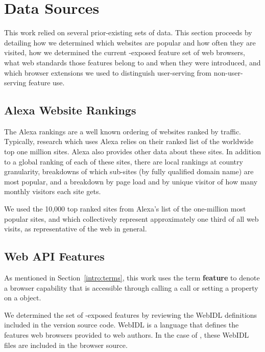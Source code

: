\section{Data Sources}
\label{measurement:data-sources}

This work relied on several prior-existing sets of data.  This section proceeds by
detailing how we determined which websites are popular and how often
they are visited, how we determined the current \JS-exposed feature set
of web browsers, what web standards those features belong to and when
they were introduced, and which browser extensions we used to distinguish
user-serving from non-user-serving feature use.


\subsection{Alexa Website Rankings}
\label{measurement:data-sources:website-popularity-rankings}
The Alexa rankings are a well known ordering of websites ranked by traffic.
Typically, research which uses Alexa relies on their ranked list of the
worldwide top one million sites. Alexa also provides other data about these sites.
In addition to a global ranking of each of these sites,
there are local rankings at country granularity, breakdowns of which
sub-sites (by fully qualified domain name) are most popular, and a breakdown by
page load and by unique visitor of how many monthly visitors each site gets.

We used the 10,000 top ranked sites from Alexa's list of the one-million
most popular sites, and which collectively represent approximately one third of
all web visits, as representative of the web in general.


\subsection{Web API Features}
\label{measurement:data-sources:method-web-standards}
As mentioned in Section~\ref{intro:terms}, this work uses the term \textbf{feature}
to denote a browser capability that is accessible through calling a
\JS call or setting a property on a \JS object.

We determined the set of \JS-exposed features by reviewing the WebIDL definitions
included in the \FF version \FFversion source
code. WebIDL is a language that defines the \JS features web browsers
provided to web authors.  In the case of \FF, these WebIDL files are
included in the browser source.

